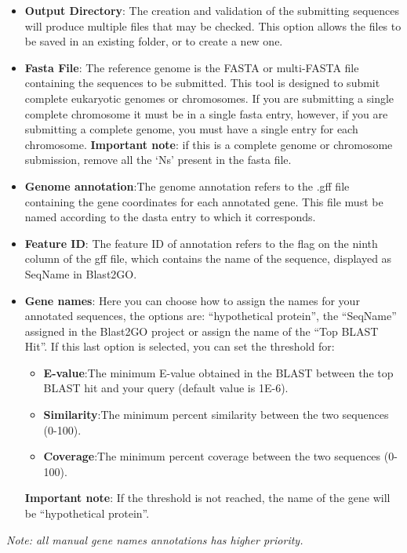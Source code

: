 \begin{itemize}
 \item \textbf{Output Directory}: The creation and validation of the submitting
 sequences will produce multiple files that may be checked. This option allows
 the files to be saved in an existing folder, or to create a new one.

 \item \textbf{Fasta File}: The reference genome is the FASTA or multi-FASTA
 file containing the sequences to be submitted. This tool is designed to submit
 complete eukaryotic genomes or chromosomes. If you are submitting a single
 complete chromosome it must be in a single fasta entry, however, if you are
 submitting a complete genome, you must have a single entry for each chromosome.
 \textbf{Important note}: if this is a complete genome or chromosome submission,
  remove all the `Ns' present in the fasta file.

 \item \textbf{Genome annotation}:The genome annotation refers to the .gff file
 containing the gene coordinates for each annotated gene. This file must be
 named according to the dasta entry to which it corresponds.

 \item \textbf{Feature ID}: The feature ID of annotation refers to the flag on
 the ninth column of the gff file, which contains the name of the sequence,
 displayed as SeqName in Blast2GO.

 \item \textbf{Gene names}:  Here you can choose how to assign the names for
 your annotated sequences, the options are: ``hypothetical protein'', the
 ``SeqName'' assigned in the Blast2GO project or assign the name of the ``Top
 BLAST Hit''.
 If this last option is selected, you can set the threshold for:
 \begin{itemize}
   \item \textbf{E-value}:The minimum E-value obtained in the BLAST between the
   top BLAST hit and your query (default value is 1E-6).
   \item \textbf{Similarity}:The minimum percent similarity between the two
   sequences (0-100).
   \item \textbf{Coverage}:The minimum percent coverage between the two
   sequences (0-100).
\end{itemize}
\textbf{Important note}: If the threshold is not reached, the name of the gene
will be ``hypothetical protein''.
\end{itemize}
\textit{Note: all manual gene names annotations has higher priority.}

